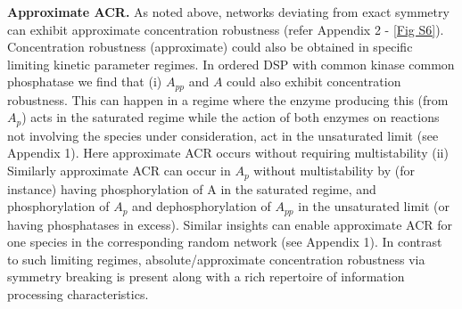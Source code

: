 \documentclass[9pt,lineno]{elife}
\begin{document}
{\bf Approximate ACR.} As noted above, networks deviating from exact symmetry can exhibit approximate concentration robustness (refer Appendix 2 - \cref{Fig S6}). Concentration robustness (approximate) could also be obtained in specific limiting kinetic parameter regimes. In ordered DSP with common kinase common phosphatase we find that (i) $A_{pp}$ and $A$ could also exhibit concentration robustness. This can happen in a regime where the enzyme producing this (from $A_p$) acts in the saturated regime while the action of both enzymes on reactions not involving the species under consideration, act in the unsaturated limit (see Appendix 1). Here approximate ACR occurs without requiring multistability (ii) Similarly approximate ACR can occur in $A_p$ without multistability by (for instance) having phosphorylation of A in the saturated regime, and phosphorylation of $A_p$ and dephosphorylation of $A_{pp}$ in the unsaturated limit (or having phosphatases in excess). Similar insights can enable approximate ACR for one species in the corresponding random network (see Appendix 1). In contrast to such limiting regimes, absolute/approximate concentration robustness via symmetry breaking is present along with a rich repertoire of information processing characteristics.
\end{document}
